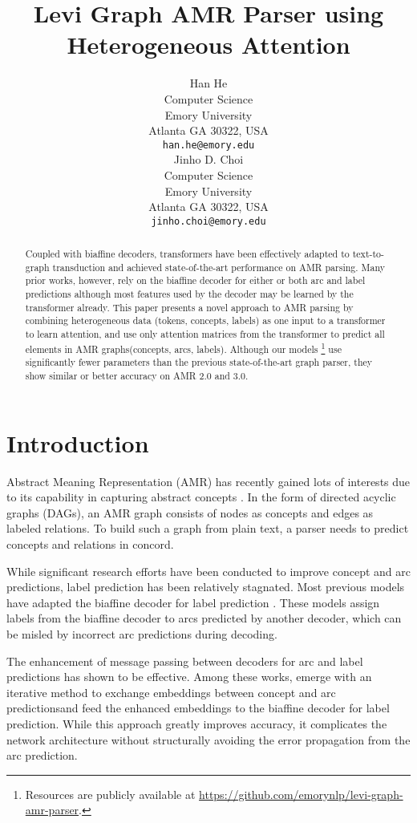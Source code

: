 \documentclass[11pt,a4paper]{article}
\title{Levi Graph AMR Parser using Heterogeneous Attention}
\author{Han He \\
  Computer Science \\
  Emory University \\
  Atlanta GA 30322, USA \\
  \texttt{han.he@emory.edu} \\\And
  Jinho D. Choi \\
  Computer Science \\
  Emory University \\
  Atlanta GA 30322, USA \\
  \texttt{jinho.choi@emory.edu} \\}
\newcommand{\LN}{\linebreak\noindent}    \newcommand{\textsec}[1]{\textsection\ref{#1}}
\begin{document}
\maketitle

\begin{abstract}

Coupled with biaffine decoders, transformers have been effectively adapted to text-to-graph transduction and achieved state-of-the-art performance on AMR parsing.
Many prior works, however, rely on the biaffine decoder for either or both arc and label predictions although most features used by the decoder may be learned by the transformer already.
This paper presents a novel approach to AMR parsing by combining heterogeneous data (tokens, concepts, labels) as one input to a transformer to learn attention, and use only attention matrices from the transformer to predict all elements in AMR graphs\LN (concepts, arcs, labels).
Although our models \footnote{Resources are publicly available at \url{https://github.com/emorynlp/levi-graph-amr-parser}.} use significantly fewer parameters than the previous state-of-the-art graph parser, they show similar or better accuracy on AMR 2.0 and 3.0.

\end{abstract} \section{Introduction}
\label{sec:introduction}

Abstract Meaning Representation (AMR) has recently gained lots of interests due to its capability in capturing abstract concepts \cite{banarescu2013abstract}. 
In the form of directed acyclic graphs (DAGs), an AMR graph consists of nodes as concepts and edges as labeled relations.
To build such a graph from plain text, a parser needs to predict concepts and relations in concord.

While significant research efforts have been conducted to improve concept and arc predictions, label prediction has been relatively stagnated. 
Most previous models have adapted the biaffine decoder for label prediction \cite{lyu-titov-2018-amr, zhang-etal-2019-amr, cai-lam-2019-core, zhou-etal-2020-amr, lindemann-etal-2020-fast}.
These models assign labels from the biaffine decoder to arcs predicted by another decoder, which can be misled by incorrect arc predictions during decoding.

The enhancement of message passing between decoders for arc and label predictions has shown to be effective.
Among these works, \citet{cai-lam-2020-amr} emerge with an iterative method to exchange embeddings between concept and arc predictions\LN and feed the enhanced embeddings to the biaffine decoder for label prediction. 
While this approach greatly improves accuracy, it complicates the network architecture without structurally avoiding the error propagation from the arc prediction.
\end{document}
